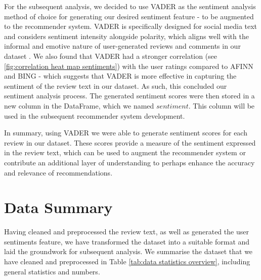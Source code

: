 For the subsequent analysis, we decided to use VADER as the sentiment analysis method of choice for generating our desired sentiment feature - to be augmented to the recommender system. VADER is  specifically designed for social media text and considers sentiment intensity alongside polarity, which aligns well with the informal and emotive nature of user-generated reviews and comments in our dataset \cite{singh2020sentiment}. We also found that VADER had a stronger correlation (see \ref{fig:correlation heat map sentiments}) with the user ratings compared to AFINN and BING - which suggests that VADER is more effective in capturing the sentiment of the review text in our dataset. As such, this concluded our sentiment analysis process. The generated sentiment scores were then stored in a new column in the DataFrame, which we named $sentiment$. This column will be used in the subsequent recommender system development.

In summary, using VADER we were able to generate sentiment scores for each review in our dataset. These scores provide a measure of the sentiment expressed in the review text, which can be used to augment the recommender system or contribute an additional layer of understanding to perhaps enhance the accuracy and relevance of recommendations.




\section{Data Summary}
\label{sec:3 Data Summary}

Having cleaned and preprocessed the review text, as well as generated the user sentiments feature, we have transformed the dataset into a suitable format and laid the groundwork for subsequent analysis. We summarise the dataset that we have cleaned and preprocessed in Table \ref{tab:data statistics overview}, including general statistics and numbers.

